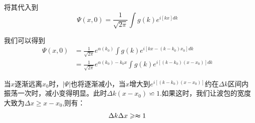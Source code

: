 \documentclass{article}
\begin{document}
将其代入到
\[\Psi(x,0)=\frac{1}{\sqrt{2\pi}}\int g(k)e^{i\left[kx\right]dk}\]

我们可以得到
\begin{align*}
    \Psi(x,0)&=\frac{1}{\sqrt{2\pi}}e^{\alpha(k_0)}\int g(k)e^{i\left[kx-(k-k_0)x_0\right]dk}\\
    &=\frac{1}{\sqrt{2\pi}}e^{\alpha(k_0)-k_0x}\int g(k)e^{i\left[(k-k_0)(x-x_0)\right]dk}
\end{align*}

当$x$逐渐远离$x_0$时，$|\Psi|$也将逐渐减小，当$x$增大到$e^{i\left[(k-k_0)(x-x_0)\right]}$约在$\Delta k$区间内振荡一次时，减小变得明显。此时$\Delta k(x-x_0)\backsimeq 1$.如果这时，我们让波包的宽度大致为$\Delta x\geqslant x-x_0$,则有：
\[
    \Delta k\Delta x\geqslant  \thickapprox 1
\]
\end{document}
